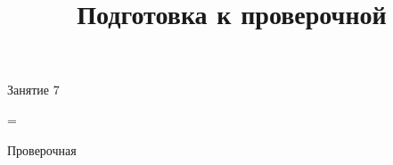 \begin{homework}[number=3]
	\begin{listofex}
		\item {}
		\item {}
		\item {}
	\end{listofex}
\end{homework}

\begin{class}[number=7]
	\title{Подготовка к проверочной}
	\begin{listofex}
		\item Занятие 7
	\end{listofex}
\end{class}

=%
\begin{exam}
	\begin{listofex}
		\item Проверочная
	\end{listofex}
\end{exam}
